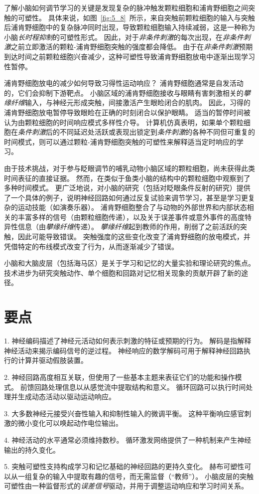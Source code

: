 了解小脑如何调节学习的关键是发现复杂的脉冲触发颗粒细胞和浦肯野细胞之间突触的可塑性。
具体来说，如图~\ref{fig:5_8}~所示，来自突触前颗粒细胞的输入与突触后浦肯野细胞中的复杂脉冲同时出现，导致颗粒细胞输入持续减弱，这是一种称为小脑\textit{长时程抑制}的可塑性形式。
因此，对于\textit{非条件刺激}的每次出现，在\textit{非条件刺激}之前立即激活的颗粒-浦肯野细胞突触的强度都会降低。
由于在\textit{非条件刺激}预期到达时间之前颗粒细胞兴奋减少，这种可塑性导致浦肯野细胞放电中逐渐出现学习性暂停。


浦肯野细胞放电的减少如何导致习得性运动响应？
浦肯野细胞通常是自发活动的，它们会抑制下游靶点。 
小脑区域的浦肯野细胞接收与眼睛有害刺激相关的\textit{攀缘纤维}输入，与神经元形成突触，间接激活产生眼睑闭合的肌肉。
因此，习得的浦肯野细胞放电暂停导致眼睑在正确的时刻闭合以保护眼睛。
适当的暂停时间被认为由颗粒细胞的时间响应模式多样性介导。
计算机仿真表明，如果单个颗粒细胞在\textit{条件刺激}后的不同延迟处活跃或表现出锁定到\textit{条件刺激}的各种不同但可重复的时间模式，则可以通过颗粒-浦肯野细胞突触的可塑性来解释适当定时响应的学习。


由于技术挑战，对于参与眨眼调节的哺乳动物小脑区域的颗粒细胞，尚未获得此类时间表征的直接证据。
然而，在类似于鱼类小脑的结构中的颗粒细胞中观察到了多种时间模式。
更广泛地说，对小脑的研究（包括对眨眼条件反射的研究）提供了一个具体的例子，说明神经回路如何通过反复试验来调节学习，甚至是学习更复杂的运动技能（如演奏乐器）。
浦肯野细胞整合了与动物的外部世界和内部状态相关的丰富多样的信号（由颗粒细胞传递），以及关于误差事件或意外事件的高度特异性信息（由\textit{攀缘纤维}传递）。
\textit{攀缘纤维}起到教师的作用，削弱了之前活跃的突触，因此可能导致错误。
突触强度的这些变化改变了浦肯野细胞的放电模式，并凭借特定的布线模式改变了行为，从而逐渐减少了错误。


小脑和大脑皮层（包括海马区）是关于学习和记忆的大量实验和理论研究的焦点。
技术进步为研究突触动作、单个细胞和回路对记忆相关现象的贡献开辟了新的途径。



\section{要点}

1. 神经编码描述了神经元活动如何表示刺激的特征或预期的行为。
解码是指解释神经活动来揭示编码信号的逆过程。
神经响应的数学解码可用于解释神经回路执行的计算并驱动假肢装置。 


2. 神经回路高度相互关联，但使用了一些基本主题来表征它们的功能和操作模式。 
前馈回路处理信息以从感觉流中提取结构和意义。 
循环回路可以执行时间处理并生成动态活动以驱动运动响应。


3. 大多数神经元接受兴奋性输入和抑制性输入的微调平衡。
这种平衡响应感官刺激的微小变化可以唤起动作电位输出。


4. 神经活动的水平通常必须维持数秒。 
循环激发网络提供了一种机制来产生神经输出的持久变化。


5. 突触可塑性支持构成学习和记忆基础的神经回路的更持久变化。
赫布可塑性可以从一组复杂的输入中提取有趣的信号，而无需监督（“教师”）。
小脑皮层的突触可塑性由一种监督形式的\textit{误差信号}驱动，并用于调整运动响应和学习时间关系。



